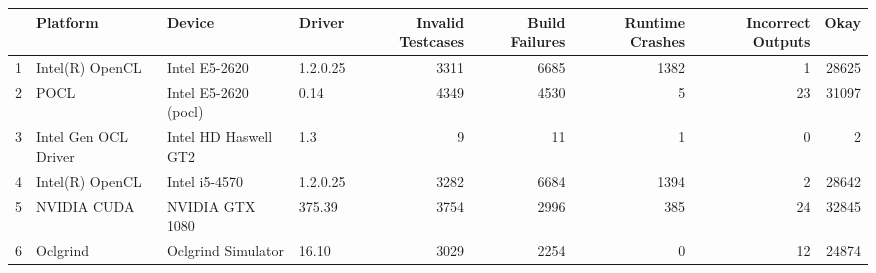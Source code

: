 \begin{tabular}{llllrrrrr}
\toprule
{} &              Platform &                Device &    Driver &  Invalid Testcases &  Build Failures &  Runtime Crashes &  Incorrect Outputs &   Okay \\
\midrule
1 &       Intel(R) OpenCL &         Intel E5-2620 &  1.2.0.25 &               3311 &            6685 &             1382 &                  1 &  28625 \\
2 &                  POCL &  Intel E5-2620 (pocl) &      0.14 &               4349 &            4530 &                5 &                 23 &  31097 \\
3 &  Intel Gen OCL Driver &  Intel HD Haswell GT2 &       1.3 &                  9 &              11 &                1 &                  0 &      2 \\
4 &       Intel(R) OpenCL &         Intel i5-4570 &  1.2.0.25 &               3282 &            6684 &             1394 &                  2 &  28642 \\
5 &           NVIDIA CUDA &       NVIDIA GTX 1080 &    375.39 &               3754 &            2996 &              385 &                 24 &  32845 \\
6 &              Oclgrind &    Oclgrind Simulator &     16.10 &               3029 &            2254 &                0 &                 12 &  24874 \\
\bottomrule
\end{tabular}
